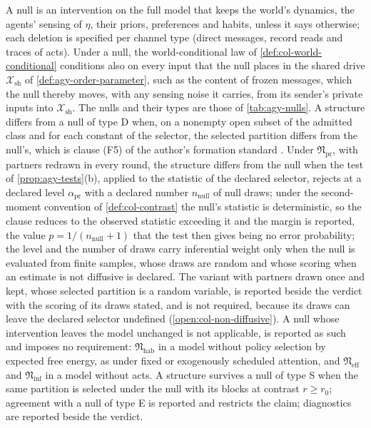 \begin{definition}\label{def:agy-nulls}
A null is an intervention on the full model that keeps the world's dynamics, the agents' sensing of $\eta$, their priors, preferences and habits, unless it says otherwise; each deletion is specified per channel type (direct messages, record reads and traces of acts). Under a null, the world-conditional law of \cref{def:col-world-conditional} conditions also on every input that the null places in the shared drive $\mathcal X_{\mathrm{sh}}$ of \cref{def:agy-order-parameter}, such as the content of frozen messages, which the null thereby moves, with any sensing noise it carries, from its sender's private inputs into $\mathcal X_{\mathrm{sh}}$. The nulls and their types are those of \cref{tab:agy-nulls}. A structure differs from a null of type D when, on a nonempty open subset of the admitted class and for each constant of the selector, the selected partition differs from the null's, which is clause (F5) of the author's formation standard \citep{dennis2026formation}. Under $\mathfrak N_{\mathrm{pr}}$, with partners redrawn in every round, the structure differs from the null when the test of \cref{prop:agy-tests}(b), applied to the statistic of the declared selector, rejects at a declared level $\alpha_{\mathrm{pr}}$ with a declared number $n_{\mathrm{null}}$ of null draws; under the second-moment convention of \cref{def:col-contrast} the null's statistic is deterministic, so the clause reduces to the observed statistic exceeding it and the margin is reported, the value $p=1/(n_{\mathrm{null}}+1)$ that the test then gives being no error probability; the level and the number of draws carry inferential weight only when the null is evaluated from finite samples, whose draws are random and whose scoring when an estimate is not diffusive is declared. The variant with partners drawn once and kept, whose selected partition is a random variable, is reported beside the verdict with the scoring of its draws stated, and is not required, because its draws can leave the declared selector undefined (\cref{open:col-non-diffusive}). A null whose intervention leaves the model unchanged is not applicable, is reported as such and imposes no requirement: $\mathfrak N_{\mathrm{hab}}$ in a model without policy selection by expected free energy, as under fixed or exogenously scheduled attention, and $\mathfrak N_{\mathrm{eff}}$ and $\mathfrak N_{\mathrm{inf}}$ in a model without acts. A structure survives a null of type S when the same partition is selected under the null with its blocks at contrast $r\ge r_0$; agreement with a null of type E is reported and restricts the claim; diagnostics are reported beside the verdict.
\end{definition}

